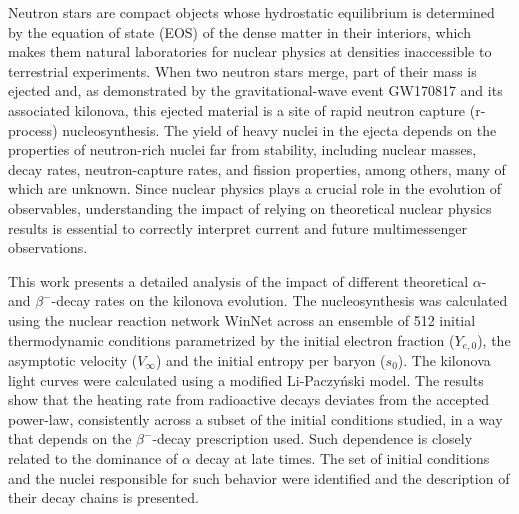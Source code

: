 %
%

\noindent Neutron stars are compact objects whose hydrostatic equilibrium is determined by the equation of state (EOS) of the dense matter in their interiors, which makes them natural laboratories for nuclear physics at densities inaccessible to terrestrial experiments.
When two neutron stars merge, part of their mass is ejected and, as demonstrated by the gravitational-wave event GW170817 and its associated kilonova, this ejected material is a site of rapid neutron capture (r-process) nucleosynthesis.
The yield of heavy nuclei in the ejecta depends on the properties of neutron-rich nuclei far from stability, including nuclear masses, decay rates, neutron-capture rates, and fission properties, among others, many of which are unknown.
Since nuclear physics plays a crucial role in the evolution of observables, understanding the impact of relying on theoretical nuclear physics results is essential to correctly interpret current and future multimessenger observations.

This work presents a detailed analysis of the impact of different theoretical $\alpha$- and $\beta^{-}$-decay rates on the kilonova evolution.
The nucleosynthesis was calculated using the nuclear reaction network WinNet across an ensemble of 512 initial thermodynamic conditions parametrized by the initial electron fraction ($Y_{e,0}$), the asymptotic velocity ($V_{\infty}$) and the initial entropy per baryon ($s_{0}$).
The kilonova light curves were calculated using a modified Li-Paczy\'nski model. 
The results show that the heating rate from radioactive decays deviates from the accepted power-law, consistently across a subset of the initial conditions studied, in a way that depends on the $\beta^{-}$-decay prescription used.
Such dependence is closely related to the dominance of $\alpha$ decay at late times.
The set of initial conditions and the nuclei responsible for such behavior were identified and the description of their decay chains is presented.

   